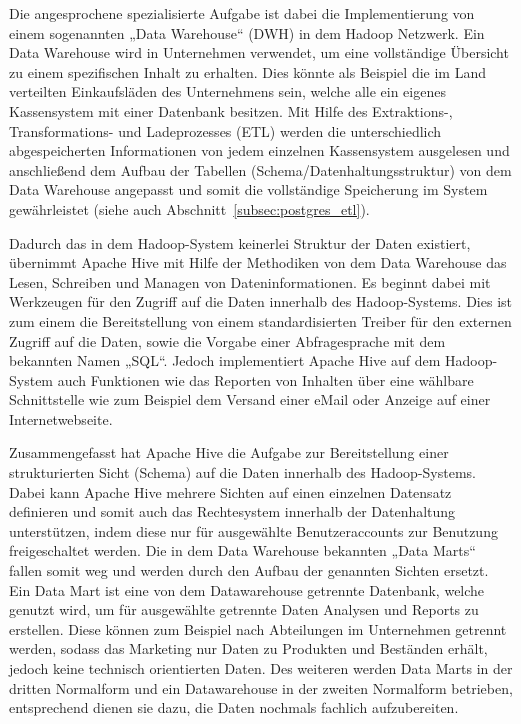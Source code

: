 Die angesprochene spezialisierte Aufgabe ist dabei die Implementierung von
einem sogenannten „Data Warehouse“ (DWH) in dem Hadoop Netzwerk. Ein Data
Warehouse wird in Unternehmen verwendet, um eine vollständige Übersicht zu
einem spezifischen Inhalt zu erhalten. Dies könnte als Beispiel die im Land
verteilten Einkaufsläden des Unternehmens sein, welche alle ein eigenes
Kassensystem mit einer Datenbank besitzen. Mit Hilfe des Extraktions-,
Transformations- und Ladeprozesses (ETL) werden die unterschiedlich
abgespeicherten Informationen von jedem einzelnen Kassensystem ausgelesen und
anschließend dem Aufbau der Tabellen (Schema/Datenhaltungsstruktur) von dem
Data Warehouse angepasst und somit die vollständige Speicherung im System
gewährleistet (siehe auch Abschnitt~\ref{subsec:postgres_etl}).

Dadurch das in dem Hadoop\hyp{}System keinerlei Struktur der Daten existiert,
übernimmt Apache Hive mit Hilfe der Methodiken von dem Data Warehouse das
Lesen, Schreiben und Managen von Dateninformationen. Es beginnt dabei mit
Werkzeugen für den Zugriff auf die Daten innerhalb des Hadoop\hyp{}Systems.
Dies ist zum einem die Bereitstellung von einem standardisierten Treiber für
den externen Zugriff auf die Daten, sowie die Vorgabe einer Abfragesprache mit
dem bekannten Namen „SQL“. Jedoch implementiert Apache Hive auf dem
Hadoop\hyp{}System auch Funktionen wie das Reporten von Inhalten über eine
wählbare Schnittstelle wie zum Beispiel dem Versand einer eMail oder Anzeige
auf einer Internetwebseite.

Zusammengefasst hat Apache Hive die Aufgabe zur Bereitstellung einer
strukturierten Sicht (Schema) auf die Daten innerhalb des Hadoop\hyp{}Systems.
Dabei kann Apache Hive mehrere Sichten auf einen einzelnen Datensatz definieren
und somit auch das Rechtesystem innerhalb der Datenhaltung unterstützen, indem
diese nur für ausgewählte Benutzeraccounts zur Benutzung freigeschaltet werden.
Die in dem Data Warehouse bekannten „Data Marts“ fallen somit weg und werden
durch den Aufbau der genannten Sichten ersetzt. Ein Data Mart ist eine von dem
Datawarehouse getrennte Datenbank, welche genutzt wird, um für ausgewählte
getrennte Daten Analysen und Reports zu erstellen. Diese können zum Beispiel
nach Abteilungen im Unternehmen getrennt werden, sodass das Marketing nur Daten
zu Produkten und Beständen erhält, jedoch keine technisch orientierten Daten.
Des weiteren werden Data Marts in der dritten Normalform und ein Datawarehouse
in der zweiten Normalform betrieben, entsprechend dienen sie dazu, die Daten
nochmals fachlich aufzubereiten.
\nl%

